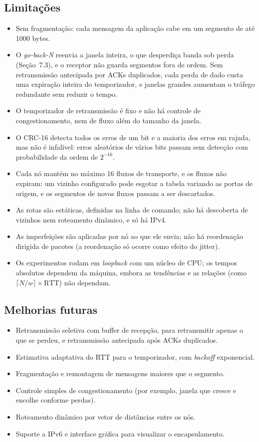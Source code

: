 \documentclass[11pt,a4paper]{article}
\begin{document}
\subsection{Limita\c{c}\~oes}
\begin{itemize}
  \item Sem fragmenta\c{c}\~ao: cada mensagem da aplica\c{c}\~ao cabe em um segmento de at\'e 1000 bytes.
  \item O \emph{go-back-N} reenvia a janela inteira, o que desperdi\c{c}a banda sob perda (Se\c{c}\~ao~7.3), e o receptor n\~ao guarda segmentos fora de ordem. Sem retransmiss\~ao antecipada por ACKs duplicados, cada perda de dado custa uma expira\c{c}\~ao inteira do temporizador, e janelas grandes aumentam o tr\'afego redundante sem reduzir o tempo.
  \item O temporizador de retransmiss\~ao \'e fixo e n\~ao h\'a controle de congestionamento, nem de fluxo al\'em do tamanho da janela.
  \item O CRC-16 detecta todos os erros de um bit e a maioria dos erros em rajada, mas n\~ao \'e infal\'ivel: erros aleat\'orios de v\'arios bits passam sem detec\c{c}\~ao com probabilidade da ordem de $2^{-16}$.
  \item Cada n\'o mant\'em no m\'aximo 16 fluxos de transporte, e os fluxos n\~ao expiram: um vizinho configurado pode esgotar a tabela variando as portas de origem, e os segmentos de novos fluxos passam a ser descartados.
  \item As rotas s\~ao est\'aticas, definidas na linha de comando; n\~ao h\'a descoberta de vizinhos nem roteamento din\^amico, e s\'o h\'a IPv4.
  \item As imperfei\c{c}\~oes s\~ao aplicadas por n\'o ao que ele envia; n\~ao h\'a reordena\c{c}\~ao dirigida de pacotes (a reordena\c{c}\~ao s\'o ocorre como efeito do jitter).
  \item Os experimentos rodam em \emph{loopback} com um n\'ucleo de CPU; os tempos absolutos dependem da m\'aquina, embora as tend\^encias e as rela\c{c}\~oes (como $\lceil N/w\rceil \times \text{RTT}$) n\~ao dependam.
\end{itemize}

\subsection{Melhorias futuras}
\begin{itemize}
  \item Retransmiss\~ao seletiva com buffer de recep\c{c}\~ao, para retransmitir apenas o que se perdeu, e retransmiss\~ao antecipada ap\'os ACKs duplicados.
  \item Estimativa adaptativa do RTT para o temporizador, com \emph{backoff} exponencial.
  \item Fragmenta\c{c}\~ao e remontagem de mensagens maiores que o segmento.
  \item Controle simples de congestionamento (por exemplo, janela que cresce e encolhe conforme perdas).
  \item Roteamento din\^amico por vetor de dist\^ancias entre os n\'os.
  \item Suporte a IPv6 e interface gr\'afica para visualizar o encapsulamento.
\end{itemize}
\end{document}
